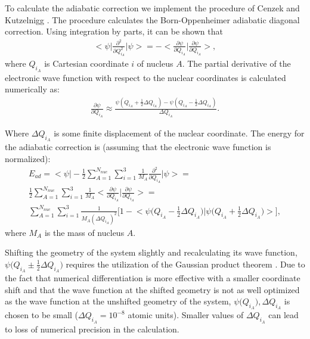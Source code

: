 \documentclass[aps,onecolumn]{revtex4}
\begin{document}
To calculate the adiabatic correction
we implement the procedure of Cenzek and Kutzelnigg \cite{Adiabatic3}. 
The procedure calculates the Born-Oppenheimer adiabatic
diagonal correction. Using integration by parts, it can be shown that
\begin{eqnarray}
\bigg<\psi\bigg|\frac{\partial^2}{\partial Q_{i_A}^2}\bigg|\psi\bigg> = -\bigg<\frac{\partial\psi}{\partial Q_{i_A}}
\bigg|\frac{\partial\psi}{\partial Q_{i_A}}\bigg>,
\end{eqnarray}
where $Q_{i_A}$ is Cartesian coordinate $i$ of nucleus $A$. 
The partial derivative of the electronic wave function
with respect to the nuclear coordinates is calculated numerically as:
\begin{eqnarray}
\frac{\partial\psi}{\partial Q_{i_A}} \approx \frac{\psi(Q_{i_A} + \frac{1}{2}\Delta Q_{i_A}) - 
\psi(Q_{i_A} - \frac{1}{2}\Delta Q_{i_A})}{\Delta Q_{i_A}}.
\end{eqnarray}

Where $\Delta Q_{i_A}$ is some finite displacement of the nuclear coordinate.
The energy for the adiabatic correction is (assuming  that the electronic wave function
is normalized):
\begin{eqnarray}
E_{ad} = \Big<\psi\Big|-\frac{1}{2}\sum_{A=1}^{N_{nuc}}\sum_{i=1}^3\frac{1}{M_A}
\frac{\partial^2}{\partial Q_{i_A}}\Big|\psi\big> = \nonumber\\
\frac{1}{2}\sum_{A=1}^{N_{nuc}}\sum_{i=1}^3\frac{1}{M_A}\Big<\frac{\partial\psi}
{\partial Q_{i_A}}\Big|\frac{\partial\psi}{\partial Q_{i_A}}\Big> = \nonumber\\
\sum_{A=1}^{N_{nuc}}\sum_{i=1}^3\frac{1}{M_A(\Delta Q_{i_A})^2} \bigg[1 -\Big<\psi\Big(
Q_{i_A} - \frac{1}{2}\Delta Q_{i_A}\Big)\Big|\psi\Big(Q_{i_A} + \frac{1}{2}\Delta Q_{i_A}\Big)\Big>
\bigg],
\end{eqnarray}
where $M_A$ is the mass of nucleus $A$.

Shifting the geometry of the system 
slightly and recalculating its wave function, $\psi\Big(Q_{i_A} \pm \frac{1}{2}
\Delta Q_{i_A}\Big)$ requires the utilization of the Gaussian product theorem \cite{ECG_HeH+}. Due to
the fact that numerical differentiation is more effective with a smaller coordinate shift and that
the wave function at the shifted geometry is not as well optimized as the wave function 
at the unshifted geometry of the system, $\psi\Big(Q_{i_A}\Big), \Delta Q_{i_A}$
is chosen to be small ($\Delta Q_{i_A} = 10^{-8}$ atomic units). 
Smaller values of $\Delta Q_{i_A}$ can lead
to loss of numerical precision in the calculation.
\end{document}
